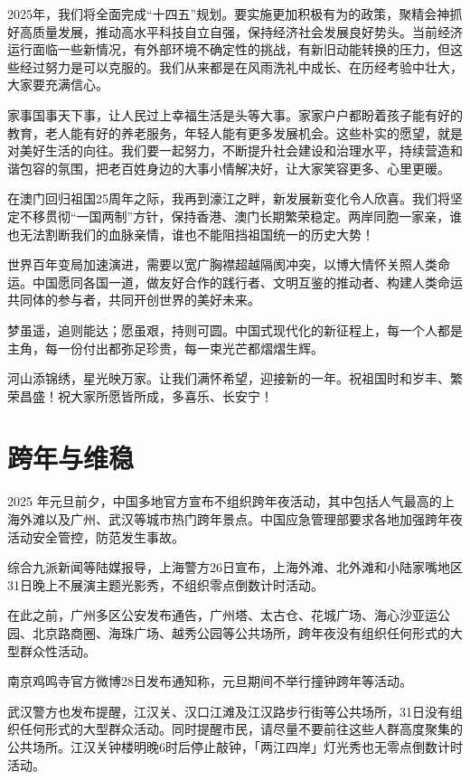 2025年，我们将全面完成“十四五”规划。要实施更加积极有为的政策，聚精会神抓好高质量发展，推动高水平科技自立自强，保持经济社会发展良好势头。当前经济运行面临一些新情况，有外部环境不确定性的挑战，有新旧动能转换的压力，但这些经过努力是可以克服的。我们从来都是在风雨洗礼中成长、在历经考验中壮大，大家要充满信心。

家事国事天下事，让人民过上幸福生活是头等大事。家家户户都盼着孩子能有好的教育，老人能有好的养老服务，年轻人能有更多发展机会。这些朴实的愿望，就是对美好生活的向往。我们要一起努力，不断提升社会建设和治理水平，持续营造和谐包容的氛围，把老百姓身边的大事小情解决好，让大家笑容更多、心里更暖。

在澳门回归祖国25周年之际，我再到濠江之畔，新发展新变化令人欣喜。我们将坚定不移贯彻“一国两制”方针，保持香港、澳门长期繁荣稳定。两岸同胞一家亲，谁也无法割断我们的血脉亲情，谁也不能阻挡祖国统一的历史大势！

世界百年变局加速演进，需要以宽广胸襟超越隔阂冲突，以博大情怀关照人类命运。中国愿同各国一道，做友好合作的践行者、文明互鉴的推动者、构建人类命运共同体的参与者，共同开创世界的美好未来。

梦虽遥，追则能达；愿虽艰，持则可圆。中国式现代化的新征程上，每一个人都是主角，每一份付出都弥足珍贵，每一束光芒都熠熠生辉。

河山添锦绣，星光映万家。让我们满怀希望，迎接新的一年。祝祖国时和岁丰、繁荣昌盛！祝大家所愿皆所成，多喜乐、长安宁！

\section{跨年与维稳}

2025 年元旦前夕，中国多地官方宣布不组织跨年夜活动，其中包括人气最高的上海外滩以及广州、武汉等城市热门跨年景点。中国应急管理部要求各地加强跨年夜活动安全管控，防范发生事故。

综合九派新闻等陆媒报导，上海警方26日宣布，上海外滩、北外滩和小陆家嘴地区31日晚上不展演主题光影秀，不组织零点倒数计时活动。

在此之前，广州多区公安发布通告，广州塔、太古仓、花城广场、海心沙亚运公园、北京路商圈、海珠广场、越秀公园等公共场所，跨年夜没有组织任何形式的大型群众性活动。

南京鸡鸣寺官方微博28日发布通知称，元旦期间不举行撞钟跨年等活动。

武汉警方也发布提醒，江汉关、汉口江滩及江汉路步行街等公共场所，31日没有组织任何形式的大型群众活动。同时提醒市民，请尽量不要前往这些人群高度聚集的公共场所。江汉关钟楼明晚6时后停止敲钟，「两江四岸」灯光秀也无零点倒数计时活动。

